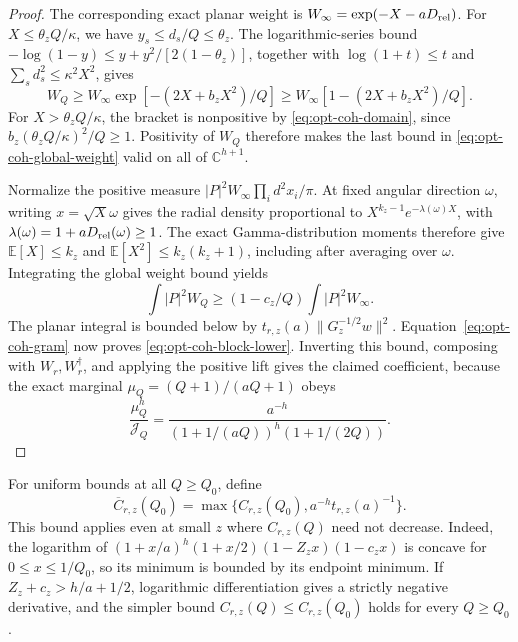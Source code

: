 \documentclass[11pt]{article}
\begin{document}
\begin{proof}
The corresponding exact planar weight is
$W_\infty=\exp(-X-aD_{\rm rel})$. For $X\le\theta_zQ/\kappa$,
we have $y_s\le d_s/Q\le\theta_z$. The logarithmic-series bound
$-\log(1-y)\le y+y^2/[2(1-\theta_z)]$, together with
$\log(1+t)\le t$ and $\sum_sd_s^2\le\kappa^2X^2$, gives
\begin{equation}\label{eq:opt-coh-global-weight}
 W_Q\ge W_\infty\exp[-(2X+b_zX^2)/Q]
      \ge W_\infty[1-(2X+b_zX^2)/Q].
\end{equation}
For $X>\theta_zQ/\kappa$, the bracket is nonpositive by
\eqref{eq:opt-coh-domain}, since
$b_z(\theta_zQ/\kappa)^2/Q\ge1$.
Positivity of $W_Q$ therefore makes the last bound in
\eqref{eq:opt-coh-global-weight} valid on all of $\mathbb C^{h+1}$.

Normalize the positive measure $|P|^2W_\infty\prod_i d^2x_i/\pi$.
At fixed angular direction $\omega$, writing $x=\sqrt X\omega$ gives
the radial density proportional to
$X^{k_z-1}e^{-\lambda(\omega)X}$, with
$\lambda(\omega)=1+aD_{\rm rel}(\omega)\ge1$.
The exact Gamma-distribution moments therefore give
$\mathbb E[X]\le k_z$ and $\mathbb E[X^2]\le k_z(k_z+1)$,
including after averaging over $\omega$.
Integrating the global weight bound yields
\begin{equation}
 \int|P|^2W_Q\ge(1-c_z/Q)\int|P|^2W_\infty.
\end{equation}
The planar integral is bounded below by
$t_{r,z}(a)\|G_z^{-1/2}w\|^2$.
Equation~\eqref{eq:opt-coh-gram} now proves
\eqref{eq:opt-coh-block-lower}. Inverting this bound, composing with
$W_r,W_r^\dagger$, and applying the positive lift gives the claimed
coefficient, because the exact marginal $\mu_Q=(Q+1)/(aQ+1)$ obeys
\begin{equation}
 \frac{\mu_Q^h}{\mathcal J_Q}
 =\frac{a^{-h}}{(1+1/(aQ))^h(1+1/(2Q))}.
\end{equation}
\end{proof}

For uniform bounds at all $Q\ge Q_0$, define
\begin{equation}\label{eq:opt-coh-uniform}
 \overline C_{r,z}(Q_0)=
 \max\{C_{r,z}(Q_0),a^{-h}t_{r,z}(a)^{-1}\}.
\end{equation}
This bound applies even at small $z$ where $C_{r,z}(Q)$ need not decrease.
Indeed, the logarithm of
$(1+x/a)^h(1+x/2)(1-Z_zx)(1-c_zx)$ is concave for
$0\le x\le1/Q_0$, so its minimum is bounded by its endpoint minimum.
If $Z_z+c_z>h/a+1/2$, logarithmic differentiation gives a strictly
negative derivative, and the simpler bound $C_{r,z}(Q)\le C_{r,z}(Q_0)$
holds for every $Q\ge Q_0$.
\end{document}
